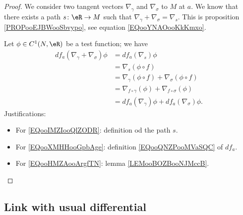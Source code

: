 \begin{proof}
	We consider two tangent vectors \( \nabla_{\gamma}\) and \( \nabla_{\sigma}\) to \( M\) at \( a\). We know that there exists a path \( s\colon \eR\to M\) such that \( \nabla_{\gamma}+\nabla_{\sigma}=\nabla_s\). This is proposition \ref{PROPooEJBWooSbvypo}, see equation \eqref{EQooYNAOooKkKmxo}.

	Let \( \phi\in C^1(N,\eR)\) be a test function; we have
	\begin{subequations}
		\begin{align}
			df_a(\nabla_{\gamma}+\nabla_{\sigma})\phi & =df_a(\nabla_s)\phi  \label{EQooIMZIooQlZODR}                                           \\
			                                          & =\nabla_s(\phi\circ f)     \label{EQooXMHHooGpbAge}                                     \\
			                                          & =\nabla_{\gamma}(\phi\circ f)+\nabla_{\sigma}(\phi\circ f)                              \\
			                                          & =\nabla_{f\circ \gamma}(\phi)+\nabla_{f\circ \sigma}(\phi)     \label{EQooHMZAooArgfTN} \\
			                                          & =df_a(\nabla_{\gamma})\phi+df_a(\nabla_{\sigma})\phi.
		\end{align}
	\end{subequations}
	Justifications:
	\begin{itemize}
		\item For \eqref{EQooIMZIooQlZODR}: definition od the path \( s\).
		\item For \eqref{EQooXMHHooGpbAge}: definition \eqref{EQooQNZPooMVaSQC} of \( df_a\).
		\item For \eqref{EQooHMZAooArgfTN}: lemma \ref{LEMooBOZBooNJMccB}.
	\end{itemize}
\end{proof}


\subsection{Link with usual differential}

